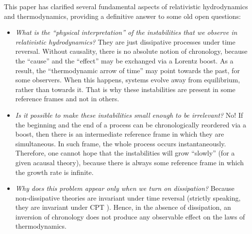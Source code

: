 \documentclass[a4paper, amsfonts, amssymb, amsmath, reprint, showkeys,  twoside, onecolumn,notitlepage,nofootinbib]{revtex4-1}
\theoremstyle{definition}
\theoremstyle{theorem}
\begin{document}
This paper has clarified several fundamental aspects of relativistic hydrodynamics and thermodynamics, providing a definitive answer to some old open questions:
\begin{itemize}
\item[1)] \textit{What is the ``physical interpretation'' of the instabilities that we observe in relativistic hydrodynamics?} They are just dissipative processes under time reversal. Without causality, there is no absolute notion of chronology, because the ``cause'' and the ``effect'' may be exchanged via a Lorentz boost. As a result, the ``thermodynamic arrow of time'' may point towards the past, for some observers. When this happens, systems evolve away from equilibrium, rather than towards it. That is why these instabilities are present in some reference frames and not in others.
\item[2)] \textit{Is it possible to make these instabilities small enough to be irrelevant?} No! If the beginning and the end of a process can be chronologically reordered via a boost, then there is an intermediate reference frame in which they are simultaneous. In such frame, the whole process occurs instantaneously. Therefore, one cannot hope that the instabilities will grow ``slowly'' (for a given acausal theory), because there is always some reference frame in which the growth rate is infinite.
\item[3)] \textit{Why does this problem appear only when we turn on dissipation?} Because non-dissipative theories are invariant under time reversal (strictly speaking, they are invariant under CPT \cite{weinbergQFT_1995}). Hence, in the absence of dissipation, an inversion of chronology does not produce any observable effect on the laws of thermodynamics.

\end{itemize}
\end{document}

